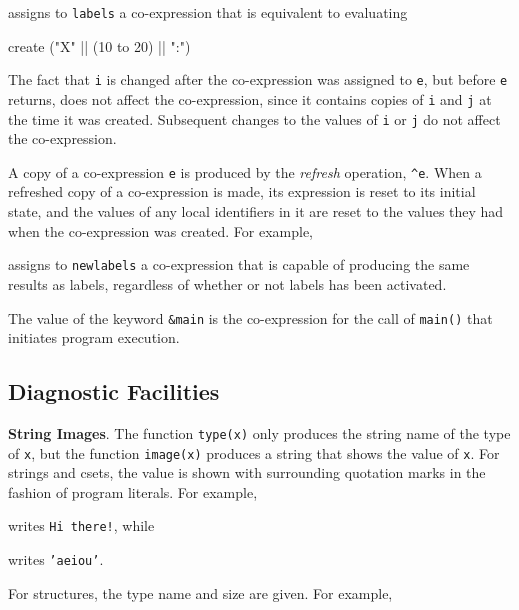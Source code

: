 
\noindent assigns to \texttt{labels} a co-expression that is
equivalent to evaluating

\begin{iconcode}
\>create ("X" || (10 to 20) || ":")
\end{iconcode}

The fact that \texttt{i} is changed after the co-expression was
assigned to \texttt{e}, but before \texttt{e} returns, does not affect
the co-expression, since it contains copies of \texttt{i} and
\texttt{j} at the time it was created.  Subsequent changes to the
values of \texttt{i} or \texttt{j} do not affect the co-expression.

A copy of a co-expression \texttt{e} is produced by the
\textit{refresh }operation, \texttt{\^{}e}. When a refreshed copy of a
co-expression is made, its expression is reset to its initial state,
and the values of any local identifiers in it are reset to the values
they had when the co-expression was created. For example,


\noindent assigns to \texttt{newlabels} a co-expression that is
capable of producing the same results as labels, regardless of whether
or not labels has been activated.

The value of the keyword \texttt{\&main} is the co-expression for the
call of \texttt{main()} that initiates program execution.


\subsection{Diagnostic Facilities}

\textbf{String Images}. The function \texttt{type(x)} only produces
the string name of the type of \texttt{x}, but the function
\texttt{image(x)} produces a string that shows the value of
\texttt{x}. For strings and csets, the value is shown with surrounding
quotation marks in the fashion of program literals. For example,


\noindent writes \texttt{{\textquotedbl}Hi there!{\textquotedbl}}, while


\noindent writes \texttt{{}'aeiou'}.

For structures, the type name and size are given. For example,

